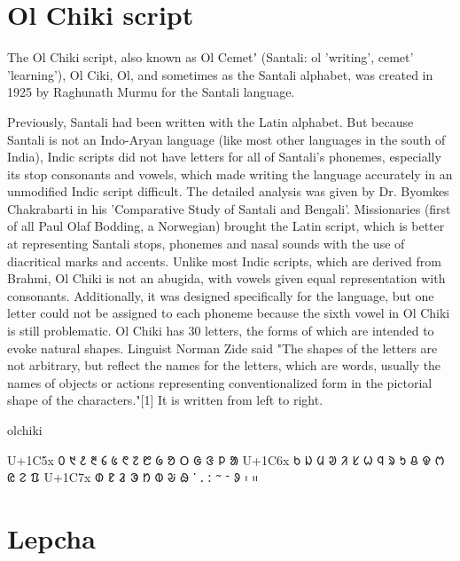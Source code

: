 




\section{Ol Chiki script}
\arial

The Ol Chiki script, also known as Ol Cemetʼ (Santali: ol 'writing', cemet' 'learning'), Ol Ciki, Ol, and sometimes as the Santali alphabet, was created in 1925 by Raghunath Murmu for the Santali language.

Previously, Santali had been written with the Latin alphabet. But because Santali is not an Indo-Aryan language (like most other languages in the south of India), Indic scripts did not have letters for all of Santali's phonemes, especially its stop consonants and vowels, which made writing the language accurately in an unmodified Indic script difficult. The detailed analysis was given by Dr. Byomkes Chakrabarti in his 'Comparative Study of Santali and Bengali'. Missionaries (first of all Paul Olaf Bodding, a Norwegian) brought the Latin script, which is better at representing Santali stops, phonemes and nasal sounds with the use of diacritical marks and accents. Unlike most Indic scripts, which are derived from Brahmi, Ol Chiki is not an abugida, with vowels given equal representation with consonants. Additionally, it was designed specifically for the language, but one letter could not be assigned to each phoneme because the sixth vowel in Ol Chiki is still problematic.
Ol Chiki has 30 letters, the forms of which are intended to evoke natural shapes. Linguist Norman Zide said "The shapes of the letters are not arbitrary, but reflect the names for the letters, which are words, usually the names of objects or actions representing conventionalized form in the pictorial shape of the characters."[1] It is written from left to right.

\newfontfamily{}

\begin{scriptexample}[]{olchiki}
\bgroup
\olchiki
\obeylines

U+1C5x 	᱐	᱑	᱒	᱓	᱔	᱕	᱖	᱗	᱘	᱙	ᱚ	ᱛ	ᱜ	ᱝ	ᱞ	ᱟ
U+1C6x	   ᱠ	ᱡ	ᱢ	ᱣ	ᱤ	ᱥ	ᱦ	ᱧ	ᱨ	ᱩ	ᱪ	ᱫ	ᱬ	ᱭ	ᱮ	ᱯ
U+1C7x  	ᱰ	ᱱ	ᱲ	ᱳ	ᱴ	ᱵ	ᱶ	ᱷ	ᱸ	ᱹ	ᱺ	ᱻ	ᱼ	ᱽ	᱾	᱿
\egroup

\end{scriptexample}

\section{Lepcha}
\newfontfamily{}

